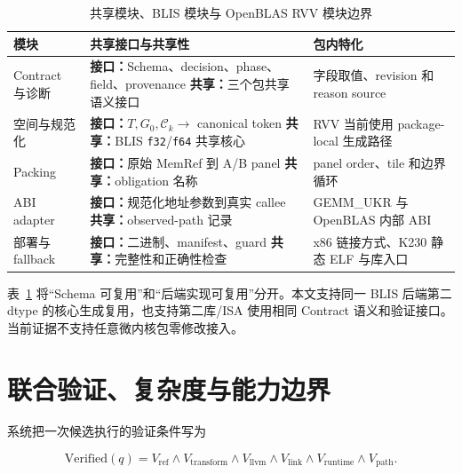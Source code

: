 \begin{table}[!htbp]
  \centering
  \caption{共享模块、BLIS 模块与 OpenBLAS RVV 模块边界}
  \label{tab:chapter4-module-boundary}
  \begingroup
  \begin{tabularx}{\textwidth}{
    @{}
    >{\centering\arraybackslash}p{}
    >{\raggedright\arraybackslash}p{}
    >{\raggedright\arraybackslash}X
    @{}
  }
    \toprule
    \textbf{模块} & \textbf{共享接口与共享性} &
    \textbf{包内特化} \\
    \midrule
    Contract 与诊断 &
    \textbf{接口：}Schema、decision、phase、field、provenance
    \newline \textbf{共享：}三个包共享语义接口 &
    字段取值、revision 和 reason source \\
    空间与规范化 &
    \textbf{接口：}$T,G_0,\mathcal{C}_k\rightarrow$ canonical token
    \newline \textbf{共享：}BLIS \texttt{f32}/\texttt{f64} 共享核心 &
    RVV 当前使用 package-local 生成路径 \\
    Packing &
    \textbf{接口：}原始 MemRef 到 A/B panel
    \newline \textbf{共享：}obligation 名称 &
    panel order、tile 和边界循环 \\
    ABI adapter &
    \textbf{接口：}规范化地址参数到真实 callee
    \newline \textbf{共享：}observed-path 记录 &
    GEMM\_UKR 与 OpenBLAS 内部 ABI \\
    部署与 fallback &
    \textbf{接口：}二进制、manifest、guard
    \newline \textbf{共享：}完整性和正确性检查 &
    x86 链接方式、K230 静态 ELF 与库入口 \\
    \bottomrule
  \end{tabularx}
  \endgroup
\end{table}

表~\ref{tab:chapter4-module-boundary} 将“Schema 可复用”和“后端实现可复用”分开。本文支持同一 BLIS 后端第二 dtype 的核心生成复用，也支持第二库/ISA 使用相同 Contract 语义和验证接口。当前证据不支持任意微内核包零修改接入。

\section{联合验证、复杂度与能力边界}

系统把一次候选执行的验证条件写为

\begin{equation}
\mathrm{Verified}(q)=
V_{\mathrm{ref}}\land
V_{\mathrm{transform}}\land
V_{\mathrm{llvm}}\land
V_{\mathrm{link}}\land
V_{\mathrm{runtime}}\land
V_{\mathrm{path}} .
\label{eq:chapter4-joint-verification}
\end{equation}

